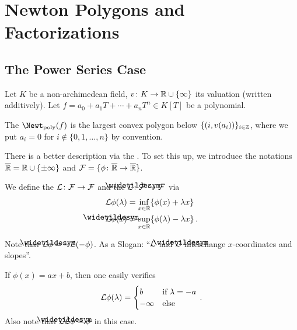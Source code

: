 \section{Newton Polygons and Factorizations}
\subsection{The Power Series Case}
Let $K$ be a non-archimedean field, $v\colon K\morphism\IR\cup\{\infty\}$ its valuation (written additively). Let $f=a_0+a_1T+\dotsb+a_nT^n\in K[T]$ be a polynomial.
\begin{defi}
	The  $\Newt_\poly(f)$ is the largest convex polygon below $\{(i,v(a_i))\}_{i\in\mathbb{Z}}$, where we put $a_i=0$ for $i\notin\{0,1,\dotsc,n\}$ by convention.
\end{defi}
There is a better description via the . To set this up, we introduce the notations $\ov{\IR}=\IR\cup\{\pm\infty\}$ and $\Ff=\{\phi\colon \ov{\IR}\morphism\ov{\IR}\}$.
\begin{defi}
	We define the  $\Ll\colon \Ff\morphism\Ff$ and the  $\snake{\Ll}\colon \Ff\morphism\Ff$ via
	\begin{align*}
		\Ll\phi(\lambda)&=\inff_{x\in\IR}\{\phi(x)+\lambda x\}\,\\
		\snake{\Ll}\phi(x)&=\sup_{x\in\IR}\{\phi(\lambda)-\lambda x\}\,.
	\end{align*}
\end{defi}
Note that $\snake{\Ll}\phi=-\Ll(-\phi)$. As a Slogan: \enquote{$\mathcal{L}$ and $\snake{\Ll}$ interchange $x$-coordinates and slopes}.
\begin{exm}\label{exm:LegendreOfLinear}
	If $\phi(x)=ax+b$, then one easily verifies
	\begin{equation*}
		\Ll\phi(\lambda)=\begin{cases}
			b & \text{if }\lambda=-a\\
			-\infty & \text{else}
		\end{cases}\,.
	\end{equation*}
	Also note that $\snake{\Ll}\Ll\phi=\phi$ in this case.
\end{exm}
